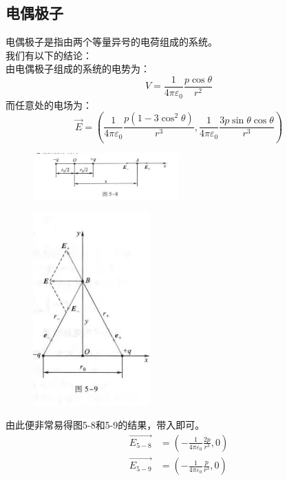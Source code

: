 \documentclass{ctexart}
\begin{document}
\subsection{电偶极子}
电偶极子是指由两个等量异号的电荷组成的系统。\\
我们有以下的结论：\\
由电偶极子组成的系统的电势为：
$$
    V = \frac{1}{4\pi \varepsilon_0} \frac{p \cos \theta}{r^2}
$$
而任意处的电场为：
$$
    \vec{E} = (\frac{1}{4\pi \varepsilon_0} \frac{p(1-3\cos^2\theta)}{r^3},\frac{1}{4\pi \varepsilon_0} \frac{3p\sin\theta\cos\theta}{r^3})
$$
\begin{figure}[H]
    \centering
    \includegraphics[width=0.5\textwidth]{img/5-8.jpg}
\end{figure}
\begin{figure}[H]
    \centering
    \includegraphics[width=0.4\textwidth]{img/5-9.jpg}
\end{figure}
由此便非常易得图5-8和5-9的结果，带入即可。
\begin{align*}
    \vec{E_{5-8}} &= (-\frac{1}{4\pi \varepsilon_0} \frac{2p}{r^3},0) \\
    \vec{E_{5-9}} &= (-\frac{1}{4\pi \varepsilon_0} \frac{p}{r^3},0)
\end{align*}
\end{document}
